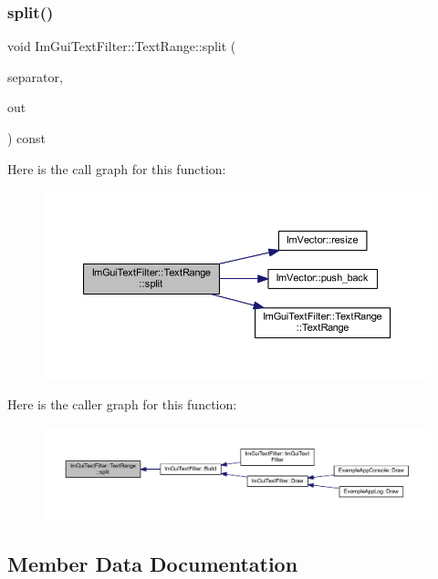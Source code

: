 \subsubsection{\texorpdfstring{split()}{split()}}
{\footnotesize\ttfamily void Im\+Gui\+Text\+Filter\+::\+Text\+Range\+::split (\begin{DoxyParamCaption}\item[{char}]{separator,  }\item[{\mbox{\hyperlink{class_im_vector}{Im\+Vector}}$<$ \mbox{\hyperlink{struct_im_gui_text_filter_1_1_text_range}{Text\+Range}} $>$ $\ast$}]{out }\end{DoxyParamCaption}) const}

Here is the call graph for this function\+:
\nopagebreak
\begin{figure}[H]
\begin{center}
\leavevmode
\includegraphics[width=350pt]{struct_im_gui_text_filter_1_1_text_range_af65b120c583d34df5eb857962a8ac912_cgraph}
\end{center}
\end{figure}
Here is the caller graph for this function\+:
\nopagebreak
\begin{figure}[H]
\begin{center}
\leavevmode
\includegraphics[width=350pt]{struct_im_gui_text_filter_1_1_text_range_af65b120c583d34df5eb857962a8ac912_icgraph}
\end{center}
\end{figure}


\subsection{Member Data Documentation}
\mbox{\label{struct_im_gui_text_filter_1_1_text_range_a705cf9c8fb0796b3bab9cf20cb18b0ca}} 
